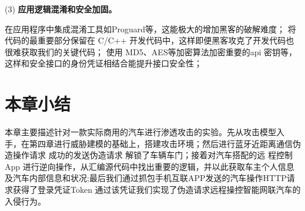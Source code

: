 (3) \textbf{应用逻辑混淆和安全加固。} 

在应用程序中集成混淆工具如Proguard等，这能极大的增加黑客的破解难度；
将代码的最重要部分保留在 C/C++ 开发代码中，这样即便黑客攻克了开发代码也很难获取我们的关键代码；
使用 MD5、AES等加密算法加密重要的api 密钥等，这样和安全接口的身份凭证相结合能提升接口安全性；

\section{本章小结}
本章主要描述针对一款实际商用的汽车进行渗透攻击的实验。先从攻击模型入
手，在第四章进行威胁建模的基础上，搭建攻击环境；然后进行蓝牙近距离通信伪造操作请求 成功的发送伪造请求 解锁了车辆车门；接着对汽车搭配的远
程控制 App 进行逆向操作，从汇编源代码中找出重要的逻辑，并以此获取车主个人信息及汽车内部信息和状况;最后我们通过抓包手机互联APP发送的汽车操作HTTP请求获得了登录凭证Token
通过该凭证我们实现了伪造请求远程操控智能网联汽车的入侵行为。
